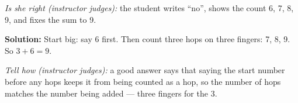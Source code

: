 \documentclass[12pt]{article}
\begin{document}
\emph{Is she right (instructor judges):} the student writes ``no'', shows
the count 6, 7, 8, 9, and fixes the sum to 9.


\textbf{Solution:} Start big: say 6 first. Then count three hops on three
fingers: 7, 8, 9. So $3+6=9$. 

\emph{Tell how (instructor judges):} a good answer says that saying the
start number before any hops keeps it from being counted as a hop, so the
number of hops matches the number being added --- three fingers for the 3.
\end{document}
